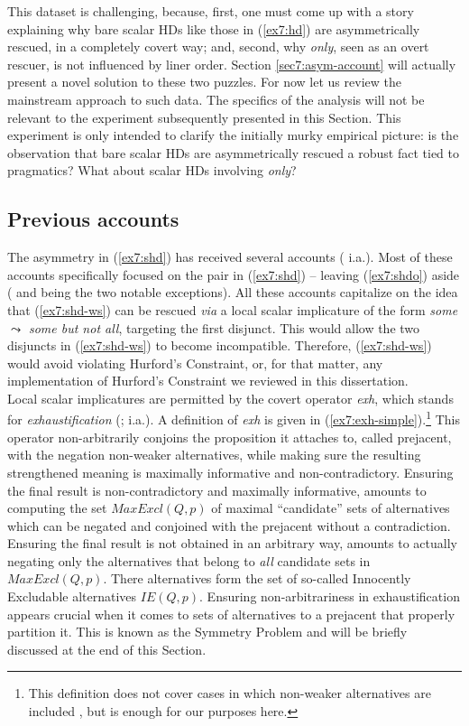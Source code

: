 This dataset is challenging, because, first, one must come up with a story explaining why bare scalar HDs like those in (\ref{ex7:hd}) are asymmetrically rescued, in a completely covert way; and, second, why \textit{only}, seen as an overt rescuer, is not influenced by liner order. Section \ref{sec7:asym-account} will actually present a novel solution to these two puzzles. For now let us review the mainstream approach to such data. The specifics of the analysis will not be relevant to the experiment subsequently presented in this Section. This experiment is only intended to clarify the initially murky empirical picture: is the observation that bare scalar HDs are asymmetrically rescued a robust fact tied to pragmatics? What about scalar HDs involving \textit{only}? 

\subsection{Previous accounts}

The asymmetry in (\ref{ex7:shd}) has received several accounts (\cite{Singh2008a,Fox2018,Tomioka2021,Ippolito2019,HenotMortier2023} i.a.). Most of these accounts specifically focused on the pair in (\ref{ex7:shd}) -- leaving (\ref{ex7:shdo}) aside ( and  being the two notable exceptions). All these accounts capitalize on the idea that (\ref{ex7:shd-ws}) can be rescued \textit{via} a local scalar implicature of the form \textit{some $\leadsto$ \textit{some but not all}}, targeting the first disjunct. This would allow the two disjuncts in (\ref{ex7:shd-ws}) to become incompatible. Therefore,  (\ref{ex7:shd-ws}) would avoid violating Hurford's Constraint, or, for that matter, any implementation of Hurford's Constraint we reviewed in this dissertation.\\

Local scalar implicatures are permitted by the covert operator \textit{exh}, which stands for \textit{exhaustification} (; i.a.). A definition of \textit{exh} is given in (\ref{ex7:exh-simple}).\footnote{This definition does not cover cases in which non-weaker alternatives are included \citep{BarLev2017}, but is enough for our purposes here.} This operator non-arbitrarily conjoins the proposition it attaches to, called prejacent, with the negation non-weaker alternatives, while making sure the resulting strengthened meaning is maximally informative and non-contradictory. Ensuring the final result is non-contradictory and maximally informative, amounts to computing the set $MaxExcl(Q, p)$ of maximal ``candidate'' sets of alternatives which can be negated and conjoined with the prejacent without a contradiction. Ensuring the final result is not obtained in an arbitrary way, amounts to actually negating only the alternatives that belong to \textit{all} candidate sets in $MaxExcl(Q, p)$. There alternatives form the set of so-called Innocently Excludable alternatives $IE(Q, p)$. Ensuring non-arbitrariness in exhaustification appears crucial when it comes to sets of alternatives to a prejacent that properly partition it. This is known as the Symmetry Problem \citep{Kroch1972,Fox2007} and will be briefly discussed at the end of this Section. 


